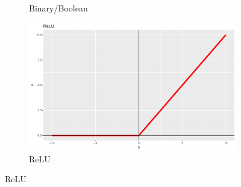 \begin{figure}[htp!]
\begin{subfigure}[t]{0.3\figwidth}
		\caption{Binary/Boolean} \label{Fig.Binary}
	\end{subfigure}
	\begin{subfigure}[t]{0.3\figwidth}
		\centering
		\includegraphics[width=\linewidth]{ReLU.pdf} 
		\caption{ReLU} \label{Fig.ReLU}
	\end{subfigure}
	

\end{figure}

